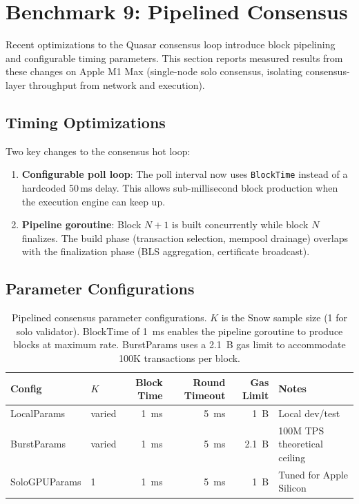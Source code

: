 \section{Benchmark 9: Pipelined Consensus}

\label{sec:pipelined}

Recent optimizations to the Quasar consensus loop introduce block pipelining and
configurable timing parameters. This section reports measured results from these
changes on Apple M1 Max (single-node solo consensus, isolating consensus-layer
throughput from network and execution).

\subsection{Timing Optimizations}

Two key changes to the consensus hot loop:

\begin{enumerate}
\item \textbf{Configurable poll loop}: The poll interval now uses \texttt{BlockTime}
      instead of a hardcoded 50\,ms delay. This allows sub-millisecond block production
      when the execution engine can keep up.
\item \textbf{Pipeline goroutine}: Block $N{+}1$ is built concurrently while block $N$
      finalizes. The build phase (transaction selection, mempool drainage) overlaps with
      the finalization phase (BLS aggregation, certificate broadcast).
\end{enumerate}

\subsection{Parameter Configurations}

\begin{table}[h]
\centering
\small
\begin{tabular}{@{}llrrrl@{}}
\toprule
\textbf{Config} & \textbf{$K$} & \textbf{Block Time} & \textbf{Round Timeout} & \textbf{Gas Limit} & \textbf{Notes} \\
\midrule
LocalParams    & varied & \SI{1}{ms}  & \SI{5}{ms}  & \SI{1}{B}   & Local dev/test \\
BurstParams    & varied & \SI{1}{ms}  & \SI{5}{ms}  & \SI{2.1}{B} & 100M TPS theoretical ceiling \\
SoloGPUParams  & 1      & \SI{1}{ms}  & \SI{5}{ms}  & \SI{1}{B}   & Tuned for Apple Silicon \\
\bottomrule
\end{tabular}
\caption{Pipelined consensus parameter configurations. $K$ is the Snow sample size
(1 for solo validator). BlockTime of \SI{1}{ms} enables the pipeline goroutine to
produce blocks at maximum rate. BurstParams uses a \SI{2.1}{B} gas limit to accommodate
100K transactions per block.}
\label{tab:pipeline_params}
\end{table}

